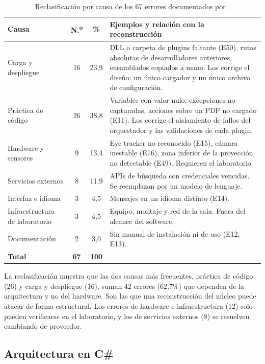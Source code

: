 \begin{table}[H]
\centering
\caption{Reclasificación por causa de los 67 errores documentados por \citet{ibaceta2023}.}
\label{tab:reclasificacion}
\small
\begin{tabularx}{\textwidth}{p{4.2cm} c c X}
\toprule
\textbf{Causa} & \textbf{N.\textsuperscript{o}} & \textbf{\%} & \textbf{Ejemplos y relación con la reconstrucción} \\ \midrule
Carga y despliegue & 16 & 23,9 & DLL o carpeta de plugins faltante (E50), rutas absolutas de desarrolladores anteriores, ensamblados copiados a mano. Los corrige el diseño: un único cargador y un único archivo de configuración. \\ \midrule
Práctica de código & 26 & 38,8 & Variables con valor nulo, excepciones no capturadas, acciones sobre un PDF no cargado (E11). Los corrige el aislamiento de fallos del orquestador y las validaciones de cada plugin. \\ \midrule
Hardware y sensores & 9 & 13,4 & Eye tracker no reconocido (E15), cámara inestable (E16), zona inferior de la proyección no detectable (E49). Requieren el laboratorio. \\ \midrule
Servicios externos & 8 & 11,9 & APIs de búsqueda con credenciales vencidas. Se reemplazan por un modelo de lenguaje. \\ \midrule
Interfaz e idioma & 3 & 4,5 & Mensajes en un idioma distinto (E14). \\ \midrule
Infraestructura de laboratorio & 3 & 4,5 & Equipo, montaje y red de la sala. Fuera del alcance del software. \\ \midrule
Documentación & 2 & 3,0 & Sin manual de instalación ni de uso (E12, E13). \\ \midrule
\textbf{Total} & \textbf{67} & \textbf{100} & \\ \bottomrule
\end{tabularx}
\end{table}

La reclasificación muestra que las dos causas más frecuentes, práctica de código (26) y carga y despliegue (16), suman 42 errores (62,7\%) que dependen de la arquitectura y no del hardware. Son las que una reconstrucción del núcleo puede atacar de forma estructural. Los errores de hardware e infraestructura (12) solo pueden verificarse en el laboratorio, y los de servicios externos (8) se resuelven cambiando de proveedor.

\subsection{Arquitectura en C\#}

